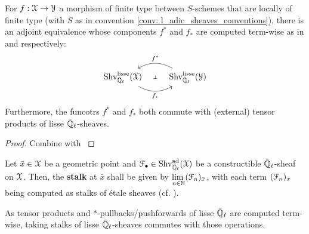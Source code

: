                 \begin{proposition} \label{prop: *_pullbacks_and_pushforwards_of_l_adic_sheaves}
                    For $f: \mathcal{X} \to \mathcal{Y}$ a morphism of finite type between $S$-schemes that are locally of finite type (with $S$ as in convention \ref{conv: l_adic_sheaves_conventions}), there is an adjoint equivalence whose components $f^*$ and $f_*$ are computed term-wise as in \cite[\href{https://stacks.math.columbia.edu/tag/03PZ}{Tag 03PZ}]{stacks} and  \cite[\href{https://stacks.math.columbia.edu/tag/03PV}{Tag 03PV}]{stacks} respectively:
                        $$
                            \begin{tikzcd}
                            	{\Shv_{\bar{\Q}_{\ell}}^{\lisse}(\calX)} & {\Shv_{\bar{\Q}_{\ell}}^{\lisse}(\calY)}
                            	\arrow[""{name=0, anchor=center, inner sep=0}, "{f_*}"', bend right, from=1-1, to=1-2]
                            	\arrow[""{name=1, anchor=center, inner sep=0}, "{f^*}"', bend right, from=1-2, to=1-1]
                            	\arrow["\dashv"{anchor=center, rotate=-90}, draw=none, from=1, to=0]
                            \end{tikzcd}
                        $$
                    Furthermore, the funcotrs $f^*$ and $f_*$ both commute with (external) tensor products of lisse $\bar{\mathbb{Q}}_{\ell}$-sheaves.
                \end{proposition}
                    \begin{proof}
                        Combine \cite[Proposition 8.3]{laszlo_olsson_adic_sheaves_on_artin_stacks_2} with \cite[Theorem II.7.1]{kiehl_weissauer_weil_conjecture_perverse_sheaves_and_l_adic_fourier_transform}
                    \end{proof}
                
                \begin{definition} \label{def: stalks_of_constructible_adic_sheaves}
                    \cite[Definition 1.4.4.3]{conrad_etale_cohomology} Let $\bar{x} \in \mathcal{X}$ be a geometric point and $\mathcal{F}_{\bullet} \in \mathrm{Shv}_{\bar{\mathbb{Q}}_{\ell}}^{\mathrm{ad}}(\mathcal{X})$ be a constructible $\bar{\mathbb{Q}}_{\ell}$-sheaf on $\mathcal{X}$. Then, the \textbf{stalk} at $\bar{x}$ shall be given by $\underset{n \in \mathbb{N}}{\operatorname{lim} \:} (\mathcal{F}_n)_{\bar{x}}$, with each term $(\mathcal{F}_n)_{\bar{x}}$ being computed as stalks of \'etale sheaves (cf. \cite[\href{https://stacks.math.columbia.edu/tag/040R}{Tag 040R}]{stacks}).
                \end{definition}
                \begin{remark}
                    As tensor products and $*$-pullbacks/pushforwards of lisse $\bar{\mathbb{Q}}_{\ell}$ are computed term-wise, taking stalks of lisse $\bar{\mathbb{Q}}_{\ell}$-sheaves commutes with those operations.
                \end{remark}
                
